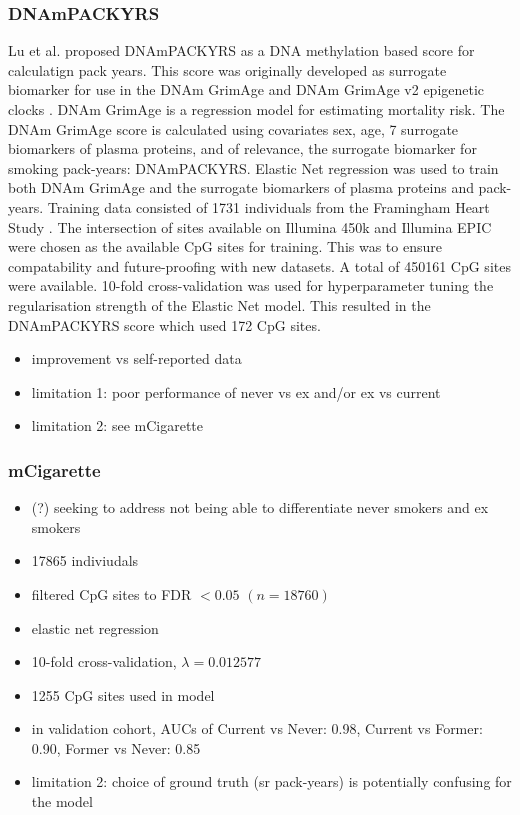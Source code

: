 \documentclass{article}
\begin{document}
\subsubsection{DNAmPACKYRS}
Lu et al. proposed DNAmPACKYRS as a DNA methylation based score for calculatign pack years. This score was originally developed as surrogate biomarker for use in the DNAm GrimAge and DNAm GrimAge v2 epigenetic clocks \cite{lu2019dna,lu2022dna}. DNAm GrimAge is a regression model for estimating mortality risk. The DNAm GrimAge score is calculated using covariates sex, age, 7 surrogate biomarkers of plasma proteins, and of relevance, the surrogate biomarker for smoking pack-years: DNAmPACKYRS. Elastic Net regression was used to train both DNAm GrimAge and the surrogate biomarkers of plasma proteins and pack-years. Training data consisted of 1731 individuals from the Framingham Heart Study \cite{doi:10.2105/AJPH.41.3.279}. The intersection of sites available on Illumina 450k and Illumina EPIC were chosen as the available CpG sites for training. This was to ensure compatability and future-proofing with new datasets. A total of 450161 CpG sites were available. 10-fold cross-validation was used for hyperparameter tuning the regularisation strength of the Elastic Net model. This resulted in the DNAmPACKYRS score which used 172 CpG sites.

\begin{itemize}
    \item improvement vs self-reported data
    \item limitation 1: poor performance of never vs ex and/or ex vs current
    \item limitation 2: see mCigarette
\end{itemize}

\subsubsection{mCigarette}
\begin{itemize}
    \item (?) seeking to address not being able to differentiate never smokers and ex smokers
    \item 17865 indiviudals
    \item filtered CpG sites to FDR \(< 0.05\) \((n = 18760)\)
    \item elastic net regression
    \item 10-fold cross-validation, \(\lambda = 0.012577\)
    \item 1255 CpG sites used in model
    \item in validation cohort, AUCs of Current vs Never: 0.98, Current vs Former: 0.90, Former vs Never: 0.85
    \item limitation 2: choice of ground truth (sr pack-years) is potentially confusing for the model
\end{itemize}
\end{document}
